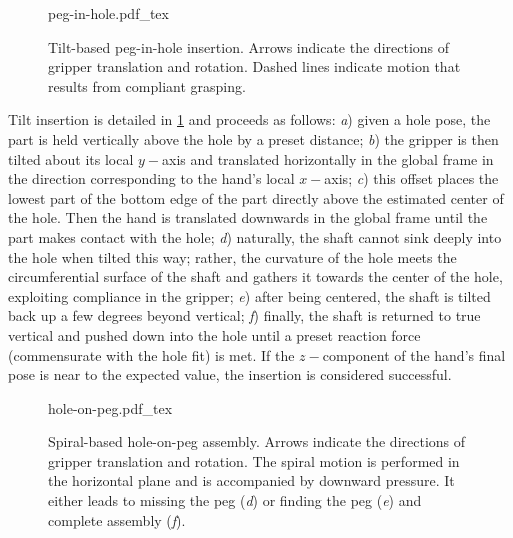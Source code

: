 \begin{figure}
	\centering
    \def\svgwidth{0.65\textwidth}
    {peg-in-hole.pdf_tex}
    \caption{Tilt-based peg-in-hole insertion. Arrows indicate the directions of gripper translation and rotation. Dashed lines indicate motion that results from compliant grasping. \label{fig:tilt-insertion}}
\end{figure}

Tilt insertion is detailed in \cref{fig:tilt-insertion} and proceeds as follows:
\textsl{a}) given a hole pose, the part is held vertically above the hole by a preset distance;
\textsl{b}) the gripper is then tilted about its local $y-$axis and translated horizontally in the global frame in the direction corresponding to the hand's local $x-$axis;
\textsl{c}) this offset places the lowest part of the bottom edge of the part directly above the estimated center of the hole. Then the hand is translated downwards in the global frame until the part makes contact with the hole;
\textsl{d}) naturally, the shaft cannot sink deeply into the hole when tilted this way; rather, the curvature of the hole meets the circumferential surface of the shaft and gathers it towards the center of the hole, exploiting compliance in the gripper;
\textsl{e}) after being centered, the shaft is tilted back up a few degrees beyond vertical;
\textsl{f}) finally, the shaft is returned to true vertical and pushed down into the hole until a preset reaction force (commensurate with the hole fit) is met. If the $z-$component of the hand's final pose is near to the expected value, the insertion is considered successful.

\begin{figure}
	\centering
    \def\svgwidth{0.65\textwidth}
    {hole-on-peg.pdf_tex}
    \caption{Spiral-based hole-on-peg assembly. Arrows indicate the directions of gripper translation and rotation. The spiral motion is performed in the horizontal plane and is accompanied by downward pressure. It either leads to missing the peg (\textsl{d}) or finding the peg (\textsl{e}) and complete assembly (\textsl{f}). \label{fig:spiral-insertion}}
\end{figure}

